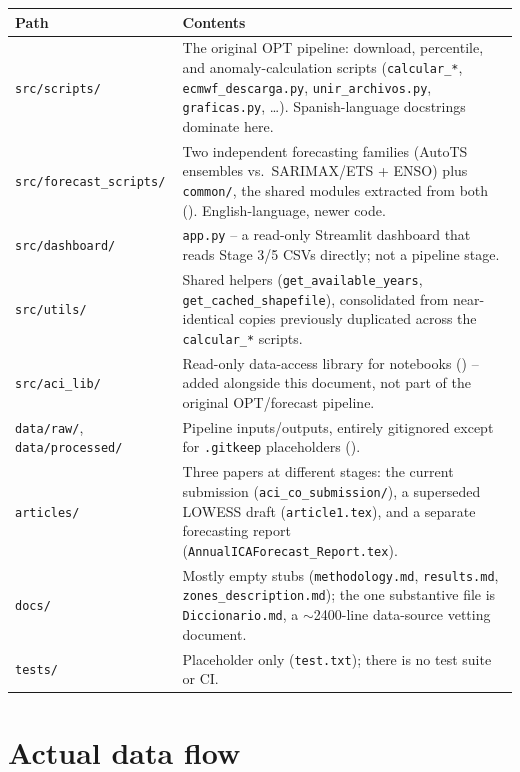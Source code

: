 \documentclass[11pt]{article}
\begin{document}
\begin{longtable}{@{}L{3.2cm}L{10.8cm}@{}}
\toprule
\textbf{Path} & \textbf{Contents} \\
\midrule
\endhead
\texttt{src/scripts/} & The original OPT pipeline: download, percentile, and anomaly-calculation scripts (\texttt{calcular\_*}, \texttt{ecmwf\_descarga.py}, \texttt{unir\_archivos.py}, \texttt{graficas.py}, \dots). Spanish-language docstrings dominate here. \\
\texttt{src/forecast\_scripts/} & Two independent forecasting families (AutoTS ensembles vs.\ SARIMAX/ETS + ENSO) plus \texttt{common/}, the shared modules extracted from both (). English-language, newer code. \\
\texttt{src/dashboard/} & \texttt{app.py} -- a read-only Streamlit dashboard that reads Stage 3/5 CSVs directly; not a pipeline stage. \\
\texttt{src/utils/} & Shared helpers (\texttt{get\_available\_years}, \texttt{get\_cached\_shapefile}), consolidated from near-identical copies previously duplicated across the \texttt{calcular\_*} scripts. \\
\texttt{src/aci\_lib/} & Read-only data-access library for notebooks () -- added alongside this document, not part of the original OPT/forecast pipeline. \\
\texttt{data/raw/}, \texttt{data/processed/} & Pipeline inputs/outputs, entirely gitignored except for \texttt{.gitkeep} placeholders (). \\
\texttt{articles/} & Three papers at different stages: the current submission (\texttt{aci\_co\_submission/}), a superseded LOWESS draft (\texttt{article1.tex}), and a separate forecasting report (\texttt{AnnualICAForecast\_Report.tex}). \\
\texttt{docs/} & Mostly empty stubs (\texttt{methodology.md}, \texttt{results.md}, \texttt{zones\_description.md}); the one substantive file is \texttt{Diccionario.md}, a $\sim$2400-line data-source vetting document. \\
\texttt{tests/} & Placeholder only (\texttt{test.txt}); there is no test suite or CI. \\
\bottomrule
\end{longtable}

\section{Actual data flow}
\end{document}
